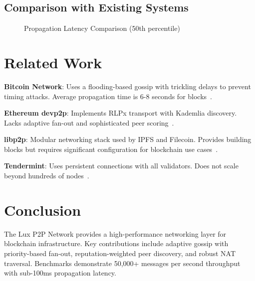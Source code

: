 \documentclass[11pt,a4paper]{article}
\begin{document}
\subsection{Comparison with Existing Systems}

\begin{figure}[htbp]
\centering
{}
\caption{Propagation Latency Comparison (50th percentile)}
\label{fig:comparison}
\end{figure}

\section{Related Work}

\textbf{Bitcoin Network}: Uses a flooding-based gossip with trickling delays to prevent timing attacks. Average propagation time is 6-8 seconds for blocks~\cite{bitcoin}.

\textbf{Ethereum devp2p}: Implements RLPx transport with Kademlia discovery. Lacks adaptive fan-out and sophisticated peer scoring~\cite{ethereum}.

\textbf{libp2p}: Modular networking stack used by IPFS and Filecoin. Provides building blocks but requires significant configuration for blockchain use cases~\cite{libp2p}.

\textbf{Tendermint}: Uses persistent connections with all validators. Does not scale beyond hundreds of nodes~\cite{tendermint}.

\section{Conclusion}

The Lux P2P Network provides a high-performance networking layer for blockchain infrastructure. Key contributions include adaptive gossip with priority-based fan-out, reputation-weighted peer discovery, and robust NAT traversal. Benchmarks demonstrate 50,000+ messages per second throughput with sub-100ms propagation latency.
\end{document}
